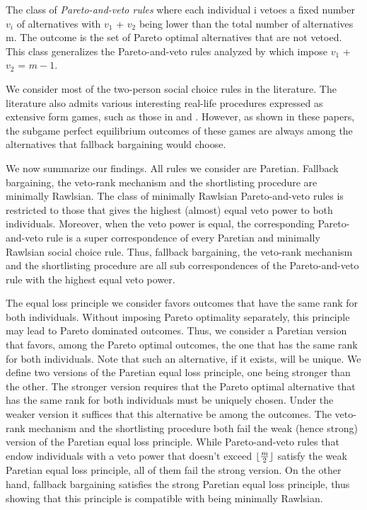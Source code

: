 \documentclass[version=3.21, pagesize, twoside=off, bibliography=totoc, DIV=calc, fontsize=12pt, a4paper]{scrartcl}
\begin{document}
The class of \textit{Pareto-and-veto rules} where each individual i vetoes a fixed number $v_i$ of alternatives with $v_1$ + $v_2$ being lower than the total number of alternatives m. The outcome is the set of Pareto optimal alternatives that are not vetoed. This class generalizes the Pareto-and-veto rules analyzed by \cite{laslier2021solution} which impose $v_1$ + $v_2$ = $m-1$.
  
We consider most of the two-person social choice rules in the literature. The literature also admits various interesting real-life procedures expressed as extensive form games, such as those in \cite{anbarci1993noncooperative, anbarci2006finite} and \cite{barbera2022compromising}. However, as shown in these papers, the subgame perfect equilibrium outcomes of these games are always among the alternatives that fallback bargaining would choose. 

We now summarize our findings. All rules we consider are Paretian. Fallback bargaining, the veto-rank mechanism and the shortlisting procedure are minimally Rawlsian. The class of minimally Rawlsian Pareto-and-veto rules is restricted to those that gives the highest (almost) equal veto power to both individuals. Moreover, when the veto power is equal, the corresponding Pareto-and-veto rule is a super correspondence of every Paretian and minimally Rawlsian social choice rule. Thus, fallback bargaining, the veto-rank mechanism and the shortlisting procedure are all sub correspondences of the Pareto-and-veto rule with the highest equal veto power.

The equal loss principle we consider favors outcomes that have the same rank for both individuals. Without imposing Pareto optimality separately, this principle may lead to Pareto dominated outcomes. Thus, we consider a Paretian version that favors, among the Pareto optimal outcomes, the one that has the same rank for both individuals. Note that such an alternative, if it exists, will be unique. We define two versions of the Paretian equal loss principle, one being stronger than the other. The stronger version requires that the Pareto optimal alternative that has the same rank for both individuals must be uniquely chosen. Under the weaker version it suffices that this alternative be among the outcomes. The veto-rank mechanism and the shortlisting procedure both fail the weak (hence strong) version of the Paretian equal loss principle. While Pareto-and-veto rules that endow individuals with a veto power that doesn't exceed $\lfloor\frac{m}{2}\rfloor$ satisfy the weak Paretian equal loss principle, all of them fail the strong version. On the other hand, fallback bargaining satisfies the strong Paretian equal loss principle, thus showing that this principle is compatible with being minimally Rawlsian.
 
\end{document}
